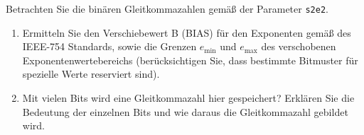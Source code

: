 
	Betrachten Sie die binären Gleitkommazahlen gemäß der Parameter \texttt{s2e2}.
	\begin{enumerate}
		\item Ermitteln Sie den Verschiebewert B (BIAS) für den Exponenten gemäß des IEEE-754 Standards, sowie die Grenzen $e_{\text{min}}$ und $e_{\text{max}}$ des verschobenen Exponentenwertebereichs  (berücksichtigen Sie, dass bestimmte Bitmuster für spezielle Werte reserviert sind).
		\item Mit vielen Bits wird eine Gleitkommazahl hier gespeichert? Erklären Sie die Bedeutung der einzelnen Bits und wie daraus die Gleitkommazahl gebildet wird.
	\end{enumerate}

